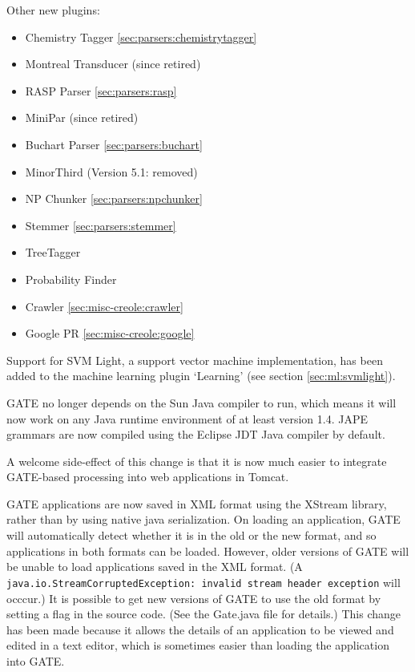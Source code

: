 Other new plugins:
\begin{itemize}
\item Chemistry Tagger \ref{sec:parsers:chemistrytagger}
\item Montreal Transducer (since retired)
\item RASP Parser \ref{sec:parsers:rasp}
\item MiniPar (since retired)
\item Buchart Parser \ref{sec:parsers:buchart}
\item MinorThird (Version 5.1: removed)
\item NP Chunker \ref{sec:parsers:npchunker}
\item Stemmer \ref{sec:parsers:stemmer}
\item TreeTagger %
\item Probability Finder %
\item Crawler \ref{sec:misc-creole:crawler}
\item Google PR \ref{sec:misc-creole:google}
\end{itemize}

Support for SVM Light, a support vector machine implementation, has been added
to the machine learning plugin `Learning' (see section \ref{sec:ml:svmlight}).



GATE no longer depends on the Sun Java compiler to run, which means it will now
work on any Java runtime environment of at least version 1.4.  JAPE grammars
are now compiled using the Eclipse JDT Java compiler by default.

A welcome side-effect of this change is that it is now much easier to integrate
GATE-based processing into web applications in Tomcat.


GATE applications are now saved in XML format using the XStream library,
rather than by using native java
serialization. On loading an application, GATE
will automatically detect whether it is in the old or the new format, and so
applications in both formats can be loaded. However, older
versions of GATE will be unable to load applications saved in the XML format. (A
{\tt java.io.StreamCorruptedException: invalid stream header exception} will
occcur.) It is possible to get new versions of GATE to use the old format by
setting a flag in the source code. (See the Gate.java file for details.) This
change has been made because it allows the details of an application to be
viewed and edited in a text editor, which is sometimes easier than loading the
application into GATE.

